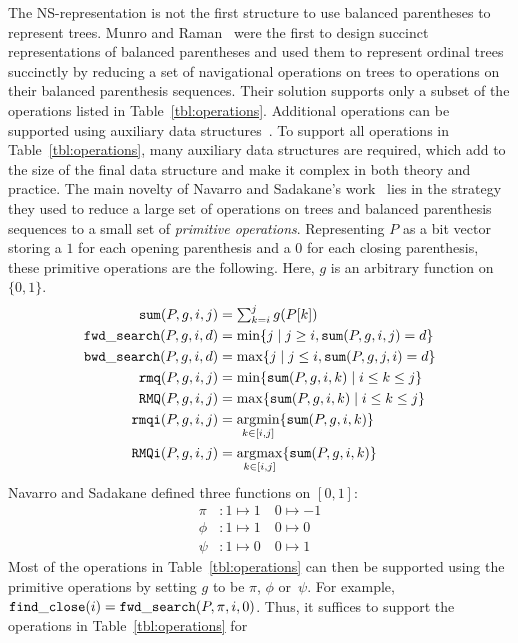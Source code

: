 The NS-representation is not the first structure to use balanced parentheses to
represent trees.
Munro and Raman~\cite{mr1997} were the first to design succinct representations
of balanced parentheses and used them to represent ordinal trees succinctly by
reducing a set of navigational operations on trees to operations on their
balanced parenthesis sequences.
Their solution supports only a subset of the operations listed in
Table~\ref{tbl:operations}.
Additional operations can be supported using  auxiliary data
structures~\cite{ly2008}.
To support all operations in Table~\ref{tbl:operations}, many auxiliary data
structures are required, which add to the size of the final data structure
and make it complex in both theory and practice.
The main novelty of Navarro and Sadakane's
work~\cite{Navarro:2014:FFS:2620785.2601073} lies in the strategy they used to
reduce a large set of operations on trees and balanced parenthesis sequences to
a small set of \emph{primitive operations}.
Representing $P$ as a bit vector storing a $1$ for each opening parenthesis
and a $0$ for each closing parenthesis, these primitive operations are the
following.
Here, $g$ is an arbitrary function on $\{0,1\}$.
\begin{align*}
\mathtt{sum}(P,g,i,j) &= \textstyle\sum_{k=i}^jg(P[k])\\
\mathtt{fwd\_search}(P,g,i,d) &= \min\{j \mid j \ge i, \mathtt{sum}(P,g,i,j) = d\}\\
\mathtt{bwd\_search}(P,g,i,d) &= \max\{j \mid j \le i, \mathtt{sum}(P,g,j,i) = d\}\\
\mathtt{rmq}(P,g,i,j) &= \min\{\mathtt{sum}(P,g,i,k) \mid i\le k\le j\}\\
\mathtt{RMQ}(P,g,i,j) &= \max\{\mathtt{sum}(P,g,i,k) \mid i\le k\le j\}\\
\mathtt{rmqi}(P,g,i,j) &= \operatorname*{arg\!\min}_{k\in[i,j]}\{\mathtt{sum}(P,g,i,k)\}\\
\mathtt{RMQi}(P,g,i,j) &= \operatorname*{arg\!\max}_{k\in[i,j]}\{\mathtt{sum}(P,g,i,k)\}
\end{align*}
Navarro and Sadakane defined three functions on $[0,1]$:
\begin{align*}
  \pi  &: 1 \mapsto 1\quad 0 \mapsto -1\\
  \phi &: 1 \mapsto 1\quad 0 \mapsto 0\\
  \psi &: 1 \mapsto 0\quad 0 \mapsto 1
\end{align*}
Most of the operations in Table~\ref{tbl:operations} can then be supported using
the primitive operations by setting $g$ to be $\pi$, $\phi$ or~$\psi$.
For example, $\mathtt{find\_close}(i) = \mathtt{fwd\_search}(P,\pi,i,0)$.
Thus, it suffices to support the operations in Table~\ref{tbl:operations} for

